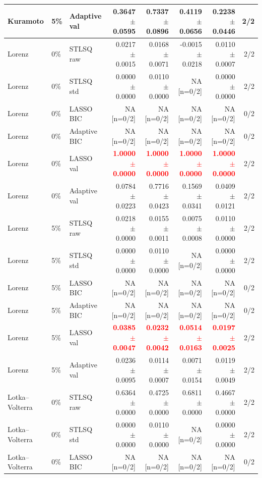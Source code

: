 \documentclass{article}
\begin{document}
\begin{longtable}{lllrrrrr}
Kuramoto & 5\% & Adaptive val & 0.3647 $\pm$ 0.0595 & 0.7337 $\pm$ 0.0896 & 0.4119 $\pm$ 0.0656 & 0.2238 $\pm$ 0.0446 & 2/2 \\
\midrule
Lorenz & 0\% & STLSQ raw & 0.0217 $\pm$ 0.0015 & 0.0168 $\pm$ 0.0071 & -0.0015 $\pm$ 0.0218 & 0.0110 $\pm$ 0.0007 & 2/2 \\
Lorenz & 0\% & STLSQ std & 0.0000 $\pm$ 0.0000 & 0.0110 $\pm$ 0.0000 & NA [n=0/2] & 0.0000 $\pm$ 0.0000 & 2/2 \\
Lorenz & 0\% & LASSO BIC & NA [n=0/2] & NA [n=0/2] & NA [n=0/2] & NA [n=0/2] & 0/2 \\
Lorenz & 0\% & Adaptive BIC & NA [n=0/2] & NA [n=0/2] & NA [n=0/2] & NA [n=0/2] & 0/2 \\
Lorenz & 0\% & LASSO val & \textcolor{red}{\textbf{1.0000 $\pm$ 0.0000}} & \textcolor{red}{\textbf{1.0000 $\pm$ 0.0000}} & \textcolor{red}{\textbf{1.0000 $\pm$ 0.0000}} & \textcolor{red}{\textbf{1.0000 $\pm$ 0.0000}} & 2/2 \\
Lorenz & 0\% & Adaptive val & 0.0784 $\pm$ 0.0223 & 0.7716 $\pm$ 0.0423 & 0.1569 $\pm$ 0.0341 & 0.0409 $\pm$ 0.0121 & 2/2 \\
\midrule
Lorenz & 5\% & STLSQ raw & 0.0218 $\pm$ 0.0000 & 0.0155 $\pm$ 0.0011 & 0.0075 $\pm$ 0.0008 & 0.0110 $\pm$ 0.0000 & 2/2 \\
Lorenz & 5\% & STLSQ std & 0.0000 $\pm$ 0.0000 & 0.0110 $\pm$ 0.0000 & NA [n=0/2] & 0.0000 $\pm$ 0.0000 & 2/2 \\
Lorenz & 5\% & LASSO BIC & NA [n=0/2] & NA [n=0/2] & NA [n=0/2] & NA [n=0/2] & 0/2 \\
Lorenz & 5\% & Adaptive BIC & NA [n=0/2] & NA [n=0/2] & NA [n=0/2] & NA [n=0/2] & 0/2 \\
Lorenz & 5\% & LASSO val & \textcolor{red}{\textbf{0.0385 $\pm$ 0.0047}} & \textcolor{red}{\textbf{0.0232 $\pm$ 0.0042}} & \textcolor{red}{\textbf{0.0514 $\pm$ 0.0163}} & \textcolor{red}{\textbf{0.0197 $\pm$ 0.0025}} & 2/2 \\
Lorenz & 5\% & Adaptive val & 0.0236 $\pm$ 0.0095 & 0.0114 $\pm$ 0.0007 & 0.0071 $\pm$ 0.0154 & 0.0119 $\pm$ 0.0049 & 2/2 \\
\midrule
Lotka--Volterra & 0\% & STLSQ raw & 0.6364 $\pm$ 0.0000 & 0.4725 $\pm$ 0.0000 & 0.6811 $\pm$ 0.0000 & 0.4667 $\pm$ 0.0000 & 2/2 \\
Lotka--Volterra & 0\% & STLSQ std & 0.0000 $\pm$ 0.0000 & 0.0110 $\pm$ 0.0000 & NA [n=0/2] & 0.0000 $\pm$ 0.0000 & 2/2 \\
Lotka--Volterra & 0\% & LASSO BIC & NA [n=0/2] & NA [n=0/2] & NA [n=0/2] & NA [n=0/2] & 0/2 \\

\end{longtable}
\end{document}
